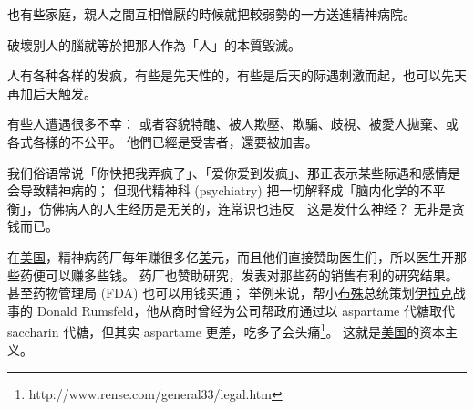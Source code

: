 \documentclass[12pt]{report}
\newcommand{\cc}[2]{#1}
\newcommand{\cc}[2]{#2}
\newcommand*\dashh{\,\,\textemdash\kern-1pt\textemdash\,\,}
\begin{document}
{\cc{
也有些家庭，親人之間互相憎厭的時候就把較弱勢的一方送進精神病院。
}{
In some dysfunctional families, quarrels happen among kins and the weaker family member is often sent to mental hospitals merely because s/he is unwanted or disliked.
}

\cc{
破壞別人的腦就等於把那人作為「人」的本質毀滅。
}{
To try to damage other people's brains is tentamount to destroying the essence of that person's \textbf{humanity}.
}

\cc{
人有各种各样的发疯，有些是先天性的，有些是后天的际遇刺激而起，也可以先天再加后天触发。
}{
People suffer from ``madness'' for various reasons, some may be genetic, but more often they are caused by experiences of emotional trauma.
}

\cc{
有些人遭遇很多不幸： 或者容貌特醜、被人欺壓、欺騙、歧視、被愛人拋棄、或各式各樣的不公平。 他們已經是受害者，還要被加害。
}{
Some people are affected by various forms of misfortune:  born with bad-looks, bullied by peers, cheated on, discriminated against, rejected by lovers, sexually abused, or fell victim to some injustice.  They \textit{are} the victims, but the psychiatry profession is exploiting these victims and hurting them even more.
}

\cc{
我们俗语常说「你快把我弄疯了」、「爱你爱到发疯」、那正表示某些际遇和感情是会导致精神病的； 但现代精神科 (psychiatry) 把一切解释成「脑内化学的不平衡」，仿佛病人的人生经历是无关的，连常识也违反 \dashh 这是发什么神经？ 无非是贪钱而已。
}{
In ordinary speech we have expressions like ``you're driving me crazy'', ``I'm crazy in love'', etc, these are precisely indications that madness can be caused by emotional experiences.  However, modern psychiatry tends to deny this, attributing mental illness to \textit{``biochemical imbalances''}, as if these have nothing to do with patients' lives and experiences.  This contradicts our common sense --- and what is causing \textit{this} madness?  Obviously, the lure of money.
}

\cc{
在\uline{美国}，精神病药厂每年赚很多亿\uline{美}元，而且他们直接赞助医生们，所以医生开那些药便可以赚多些钱。 药厂也赞助研究，发表对那些药的销售有利的研究结果。 甚至药物管理局 (FDA) 也可以用钱买通； 举例来说，帮小\uline{布殊}总统策划\uline{伊拉克}战事的 Donald Rumsfeld，他从商时曾经为公司帮政府通过以 aspartame 代糖取代 saccharin 代糖，但其实 aspartame 更差，吃多了会头痛\footnote{http://www.rense.com/general33/legal.htm}。 这就是\uline{美国}的资本主义。
}{
In the USA, pharmceutical companies specializing on psychiatric drugs make \$billions per year, and they directly sponsor doctors, so doctors earn more money if they prescribe those drugs.  Drug companies also sponsor research, publishing results that benefit the sales of their own drugs.  Even the FDA (food and drugs administration) can be bribed with money.  As an example, Donald Rumsfeld (the guy who helped ex-president Bush Jr to organize the War of Iraq (2003-2011)), used to work for a company that legitimized the artificial sweetener \textbf{aspartame}, which gradually displaced saccharin, another sweetener, in the food market.  But in fact aspartame is worse than saccharin, and causes headaches when taken \footnote{http://www.rense.com/general33/legal.htm}.  This is American-style capitalism.
}

}
\end{document}
